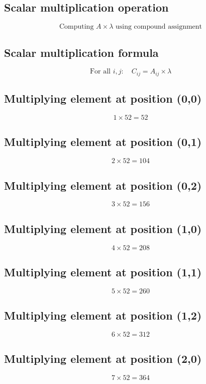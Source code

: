 \documentclass{article}
\begin{document}
\subsection*{ \vspace{1em} Scalar multiplication operation}
\[
\text{Computing } A \times \lambda \text{ using compound assignment}
\]
\subsection*{ \vspace{1em} Scalar multiplication formula}
\[
\text{For all } i,j: \quad C_{ij} = A_{ij} \times \lambda
\]
\subsection*{ \vspace{1em} Multiplying element at position (0,0)}
\[
1 \times 52 = 52
\]
\subsection*{ \vspace{1em} Multiplying element at position (0,1)}
\[
2 \times 52 = 104
\]
\subsection*{ \vspace{1em} Multiplying element at position (0,2)}
\[
3 \times 52 = 156
\]
\subsection*{ \vspace{1em} Multiplying element at position (1,0)}
\[
4 \times 52 = 208
\]
\subsection*{ \vspace{1em} Multiplying element at position (1,1)}
\[
5 \times 52 = 260
\]
\subsection*{ \vspace{1em} Multiplying element at position (1,2)}
\[
6 \times 52 = 312
\]
\subsection*{ \vspace{1em} Multiplying element at position (2,0)}
\[
7 \times 52 = 364
\]
\end{document}
